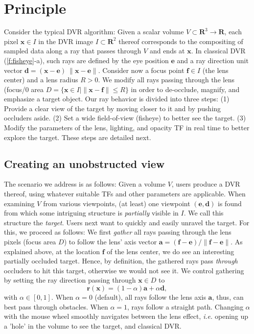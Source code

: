 \section{Principle}
\label{sec:principle}
%
%
Consider the typical DVR algorithm: Given a scalar volume $V \subset \mathbf{R}^3 \rightarrow \mathbf{R}$, each pixel $\mathbf{x} \in I$ in the DVR image $I \subset \mathbf{R}^2$ thereof corresponds to the compositing of sampled data along a ray that passes through $V$ and ends at $\mathbf{x}$. In classical DVR (\autoref{f:fisheye}-a), such rays are defined by the eye position $\mathbf{e}$ and a ray direction unit vector $\mathbf{d} = (\mathbf{x} - \mathbf{e})\ \| \mathbf{x} - \mathbf{e} \| $. Consider now a focus point $\mathbf{f} \in I$ (the lens center) and a lens radius $R > 0$. We modify all rays passing through the lens (focus/0 area $D = \{\mathbf{x} \in I | \| \mathbf{x} - \mathbf{f} \| \leq R\}$ in order to de-occlude, magnify, and emphasize a target object. Our ray behavior is divided into three steps: (1) Provide a clear view of the target by moving closer to it and by pushing occluders aside. (2) Set a wide field-of-view (fisheye) to better see the target. (3) Modify the parameters of the lens, lighting, and opacity TF in real time to better explore the target. These steps are detailed next.

\subsection{Creating an unobstructed view}
\label{sec:gathering}
%
The scenario we address is as follows: Given a volume $V$, users produce a DVR thereof, using whatever suitable TFs and other parameters are applicable. When examining $V$ from various viewpoints, (at least) one viewpoint $(\mathbf{e},\mathbf{d})$ is found from which some intriguing structure is \emph{partially} visible in $I$. We call this structure the \emph{target}. Users next want to quickly and easily unravel the target. For this, we proceed as follows: We first \emph{gather} all rays passing through the lens pixels (focus area $D$) to follow the lens' axis vector $\mathbf{a} = (\mathbf{f} - \mathbf{e}) / \| \mathbf{f} - \mathbf{e} \|$. As explained above, at the location $\mathbf{f}$ of the lens center, we do see an interesting partially occluded target. Hence, by definition, the gathered rays pass \emph{through} occluders to hit this target, otherwise we would not see it. We control gathering by setting the ray direction passing through $\mathbf{x} \in D$ to
%
\begin{equation}
\mathbf{r}(\mathbf{x}) = (1-\alpha) \mathbf{a} + \alpha \mathbf{d},
\label{eqn:gathering}
\end{equation}
%
with $\alpha \in [0,1]$. When $\alpha=0$ (default), all rays follow the lens axis $\mathbf{a}$, thus, can best pass through obstacles. When $\alpha=1$, rays follow a straight path. Changing $\alpha$ with the mouse wheel smoothly navigates between the lens effect, \emph{i.e.} opening up a 'hole' in the volume to see the target, and classical DVR.
%
